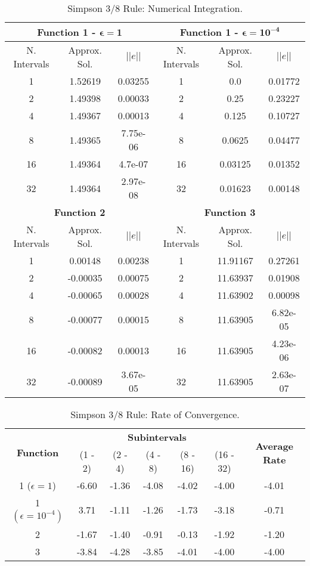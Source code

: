 \begin{table}[H]
    \centering
    \caption{Simpson 3/8 Rule: Numerical Integration.}
    \label{tab:simpson38_int}
    \begin{tabular}{ccc|ccc}
    \hline
    \multicolumn{3}{c}{\textbf{Function 1  -} $\bm{\epsilon = 1}$} & \multicolumn{3}{c}{\textbf{Function 1 -} $\bm{\epsilon = 10^{-4}}$} \\ \hline
    N. Intervals & Approx. Sol. & $|| e ||$ & N. Intervals & Approx. Sol. & $|| e ||$ \\ \hline
    1 & 1.52619 & 0.03255 & 1 & 0.0 & 0.01772 \\
    2 & 1.49398 & 0.00033 & 2 & 0.25 & 0.23227 \\
    4 & 1.49367 & 0.00013 & 4 & 0.125 & 0.10727 \\
    8 & 1.49365 & 7.75e-06 & 8 & 0.0625 & 0.04477 \\
    16 & 1.49364 & 4.7e-07 & 16 & 0.03125 & 0.01352 \\
    32 & 1.49364 & 2.97e-08 & 32 & 0.01623 & 0.00148 \\ \hline
    \multicolumn{3}{c}{\textbf{Function 2}} & \multicolumn{3}{c}{\bf{Function 3}} \\ \hline
    N. Intervals & Approx. Sol. & $|| e ||$ & N. Intervals & Approx. Sol. & $|| e ||$ \\ \hline
    1 & 0.00148  & 0.00238 & 1 & 11.91167 & 0.27261  \\
    2 & -0.00035  & 0.00075 & 2 & 11.63937 & 0.01908  \\
    4 & -0.00065 & 0.00028 & 4 & 11.63902 & 0.00098 \\
    8 & -0.00077 & 0.00015 & 8 &  11.63905 &  6.82e-05 \\
    16 & -0.00082 & 0.00013 & 16 & 11.63905 &  4.23e-06 \\
    32 & -0.00089 & 3.67e-05  & 32 & 11.63905 & 2.63e-07  \\ \hline
    \end{tabular}
\end{table}
\begin{table}[H]
    \centering
    \caption{Simpson 3/8 Rule: Rate of Convergence.}
    \label{tab:simpson38_rate}
    \begin{tabular}{ccccccc}
        \hline
        \multirow{2}{*}{\textbf{Function}} & \multicolumn{5}{c}{\textbf{Subintervals}} & \multicolumn{1}{c}{\multirow{2}{*}{\textbf{Average Rate}}} \\ \cline{2-6}
 & (1 - 2) & (2 - 4) & (4 - 8) & (8 - 16) & (16 - 32) & \multicolumn{1}{c}{} \\ \hline
        \makecell{1 \\ ($\epsilon = 1$)} & -6.60 & -1.36 & -4.08 & -4.02 & -4.00 & -4.01 \\
        \makecell{1 \\ $\left(\epsilon = 10^{-4}\right)$} & 3.71 & -1.11 & -1.26 & -1.73 & -3.18 & -0.71 \\
        2 & -1.67 & -1.40 & -0.91 & -0.13 & -1.92 & -1.20 \\ 
        3 & -3.84 & -4.28 & -3.85 & -4.01 & -4.00 & -4.00 \\ \hline
    \end{tabular}
\end{table}

